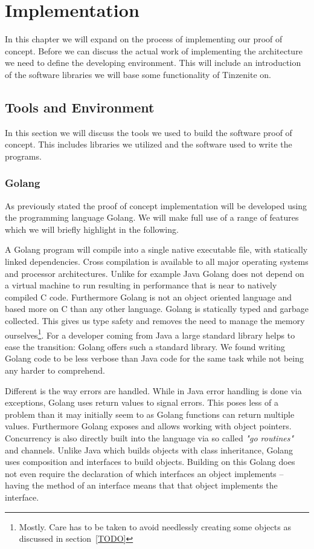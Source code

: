 \chapter{Implementation}
\label{chap:Implementation}

In this chapter we will expand on the process of implementing our proof of concept.
Before we can discuss the actual work of implementing the architecture we need to define the developing environment.
This will include an introduction of the software libraries we will base some functionality of Tinzenite on.

\section{Tools and Environment}
\label{sec:Tools and Environment}

In this section we will discuss the tools we used to build the software proof of concept.
This includes libraries we utilized and the software used to write the programs.

\subsection{Golang}
\label{sub:Golang}

As previously stated the proof of concept implementation will be developed using the programming language Golang.
We will make full use of a range of features which we will briefly highlight in the following.

A Golang program will compile into a single native executable file, with statically linked dependencies.
Cross compilation is available to all major operating systems and processor architectures.
Unlike for example Java Golang does not depend on a virtual machine to run resulting in performance that is near to natively compiled C code.
Furthermore Golang is not an object oriented language and based more on C than any other language.
Golang is statically typed and garbage collected.
This gives us type safety and removes the need to manage the memory ourselves\footnote{Mostly. Care has to be taken to avoid needlessly creating some objects as discussed in section~\ref{TODO}}.
For a developer coming from Java a large standard library helps to ease the transition: Golang offers such a standard library.
We found writing Golang code to be less verbose than Java code for the same task while not being any harder to comprehend.

Different is the way errors are handled.
While in Java error handling is done via exceptions, Golang uses return values to signal errors.
This poses less of a problem than it may initially seem to as Golang functions can return multiple values.
Furthermore Golang exposes and allows working with object pointers.
Concurrency is also directly built into the language via so called \textit{"go routines"} and channels.
Unlike Java which builds objects with class inheritance, Golang uses composition and interfaces to build objects.
Building on this Golang does not even require the declaration of which interfaces an object implements -- having the method of an interface means that that object implements the interface.

